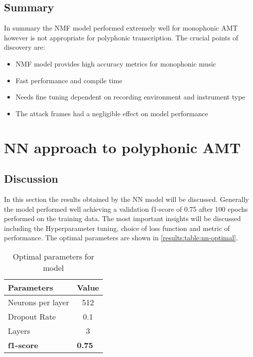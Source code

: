 \subsection{Summary}

In summary the \ac{NMF} model performed extremely well for monophonic AMT however is not
appropriate for polyphonic transcription. The crucial points of discovery are:

\begin{itemize}
    \item \ac{NMF} model provides high accuracy metrics for monophonic music
    \item Fast performance and compile time
    \item Needs fine tuning dependent on recording environment and instrument type
    \item The attack frames had a negligible effect on model performance
\end{itemize}


\section{NN approach to polyphonic AMT}

\subsection{Discussion}
In this section the results obtained by the \ac{NN} model will be discussed.
Generally the model performed well achieving a validation f1-score of 0.75 after
100 epochs performed on the training data. The most important insights will be
discussed including the Hyperparameter tuning, choice of loss function and
metric of performance. The optimal parameters are shown in \autoref{results:table:nn-optimal}.


\begin{table}[!ht]
    \centering
    \begin{tabular}{|l|c|}
        \hline
        \textbf{Parameters} & \multicolumn{1}{l|}{\textbf{Value}} \\ \hline
        Neurons per layer   & 512                                 \\ \hline
        Dropout Rate        & 0.1                                 \\ \hline
        Layers              & 3                                   \\ \hline
        \textbf{f1-score}   & \multicolumn{1}{l|}{\textbf{0.75}}  \\ \hline
    \end{tabular}
    \caption{Optimal parameters for model}
    \label{results:table:nn-optimal}
\end{table}

